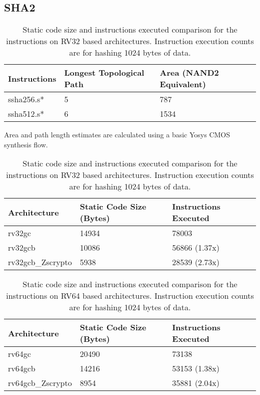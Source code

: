 \subsection{SHA2}
\label{sec:benchmark:sha2}

\begin{table}[h]
\centering
\begin{tabular}{lll}
Instructions   & Longest Topological Path & Area (NAND2 Equivalent) \\ \hline
ssha256.s*     & 5                        & 787                   \\
ssha512.s*     & 6                        & 1534                  \\
\end{tabular}
\caption{Static code size and instructions executed comparison for
the  instructions on RV32 based architectures.
Instruction execution counts are for hashing 1024 bytes of data.}
\label{tab:benchmarks:sha2:rtl}
\end{table}

Area and path length estimates are calculated using a basic Yosys CMOS
synthesis flow.

\begin{table}[h]
\centering
\begin{tabular}{lll}
Architecture      & Static Code Size (Bytes) & Instructions Executed \\ \hline
rv32gc            & 14934                    & 78003                 \\
rv32gcb           & 10086                    & 56866 (1.37x)         \\
rv32gcb\_Zscrypto & 5938                     & 28539 (2.73x)
\end{tabular}
\caption{Static code size and instructions executed comparison for
the  instructions on RV32 based architectures.
Instruction execution counts are for hashing 1024 bytes of data.}
\label{tab:benchmarks:sha256}
\end{table}

\begin{table}[h]
\centering
\begin{tabular}{lll}
Architecture      & Static Code Size (Bytes) & Instructions Executed \\ \hline
rv64gc            & 20490                    & 73138                 \\
rv64gcb           & 14216                    & 53153 (1.38x)         \\
rv64gcb\_Zscrypto & 8954                     & 35881 (2.04x)
\end{tabular}
\caption{Static code size and instructions executed comparison for
the  instructions on RV64 based architectures.
Instruction execution counts are for hashing 1024 bytes of data.}
\label{tab:benchmarks:sha512}
\end{table}

